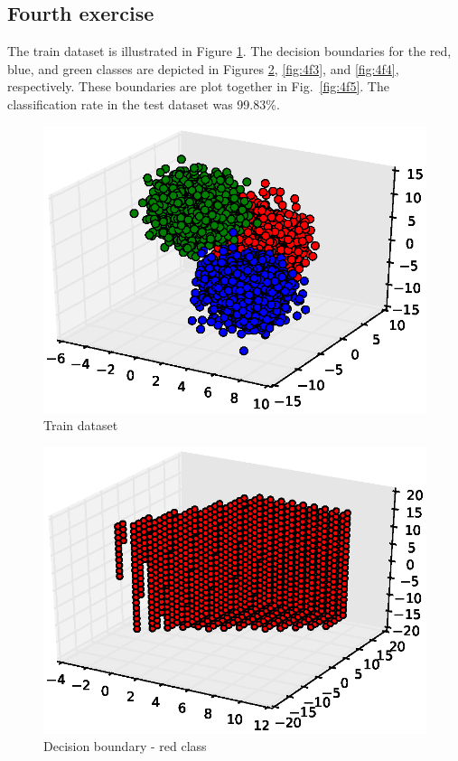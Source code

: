 \documentclass[a4paper,10pt]{article}
\begin{document}
\cleardoublepage
\subsection*{Fourth exercise}
The train dataset is illustrated in Figure \ref{fig:4f1}. The decision boundaries for the red, blue, and green classes are depicted in Figures \ref{fig:4f2}, \ref{fig:4f3}, and \ref{fig:4f4}, respectively. These boundaries are plot together in Fig.~\ref{fig:4f5}. The classification rate in the test dataset was 99.83\%.
\begin{figure}[htb]
 \centering
 \includegraphics[scale=0.6]{./figures/4f1.eps}
 \caption{Train dataset}
 \label{fig:4f1}
\end{figure}

\begin{figure}[htb]
 \centering
 \includegraphics[scale=0.6]{./figures/4f2.eps}
 \caption{Decision boundary - red class}
 \label{fig:4f2}
\end{figure}
\end{document}
